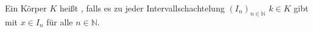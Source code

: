 Ein Körper $K$ heißt , falls es zu jeder Intervallschachtelung $(I_n)_{n \in \mathbb{N}}$  $k \in K$ gibt mit $x \in I_n$ für alle $n \in \mathbb{N}$.